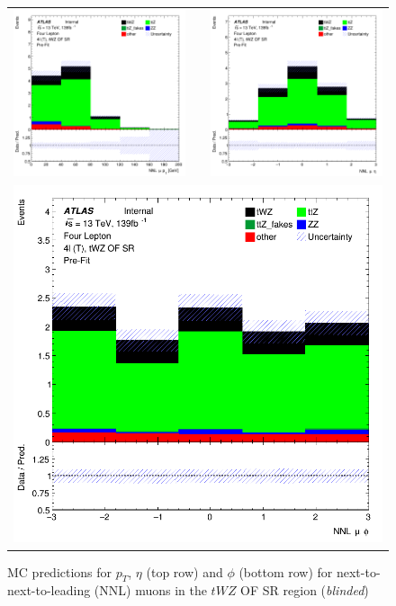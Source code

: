 \begin{figure}[htbp]
\centering
  \begin{tabular}{ccc}



    \includegraphics[width=.2\textwidth]{figures/PreFitPlots/lep4_tWZ_4T_OF_NNL_mu_pt} & &
    \includegraphics[width=.2\textwidth]{figures/PreFitPlots/lep4_tWZ_4T_OF_NNL_mu_eta}  \\
    \multicolumn{3}{c}{\includegraphics[width=.2\textwidth]{figures/PreFitPlots/lep4_tWZ_4T_OF_NNL_mu_phi}}  \\
  \end{tabular}
    \caption{MC predictions for $p_{T}$, $\eta$ (top row) and $\phi$ (bottom row) for next-to-next-to-leading (NNL) muons in the $tWZ$ OF SR region (\textit{blinded})}
  \label{fig:4lep-OF-SR-muonPlots}
\end{figure}

